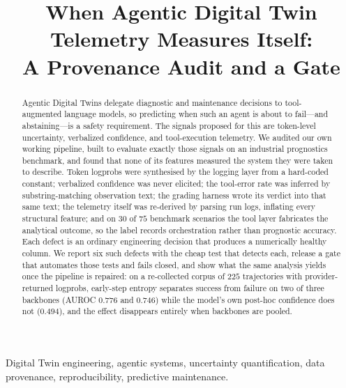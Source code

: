 \documentclass[conference]{IEEEtran}
\begin{document}
\title{When Agentic Digital Twin Telemetry Measures Itself:\\
A Provenance Audit and a Gate}

\author{
}

\maketitle

\begin{abstract}
Agentic Digital Twins delegate diagnostic and maintenance decisions to
tool-augmented language models, so predicting when such an agent is about to
fail---and abstaining---is a safety requirement. The signals proposed for this
are token-level uncertainty, verbalized confidence, and tool-execution
telemetry. We audited our own working pipeline, built to evaluate exactly those
signals on an industrial prognostics benchmark, and found that none of its
features measured the system they were taken to describe. Token logprobs were synthesised by
the logging layer from a hard-coded constant; verbalized confidence was never
elicited; the tool-error rate was inferred by substring-matching observation
text; the grading harness wrote its verdict into that same text; the telemetry
itself was re-derived by parsing run logs, inflating every structural feature;
and on $30$ of $75$ benchmark scenarios the tool layer fabricates the analytical
outcome, so the label records orchestration rather than prognostic accuracy.
Each defect is an ordinary engineering decision that produces a numerically
healthy column. We report six such defects with the cheap test that detects
each, release a gate that automates those tests and fails closed, and show what
the same analysis yields once the pipeline is repaired: on a re-collected corpus
of $225$ trajectories with provider-returned logprobs, early-step entropy
separates success from failure on two of three backbones
(AUROC $0.776$ and $0.746$) while the model's own post-hoc confidence does not
($0.494$), and the effect disappears entirely when backbones are pooled.
\end{abstract}

\begin{IEEEkeywords}
Digital Twin engineering, agentic systems, uncertainty quantification, data
provenance, reproducibility, predictive maintenance.
\end{IEEEkeywords}
\end{document}
